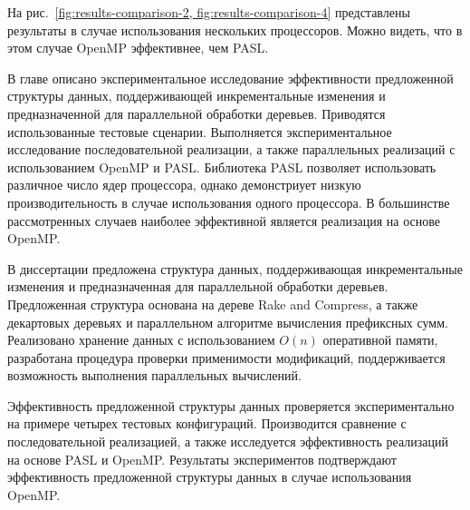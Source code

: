 \documentclass[specification,annotation]{itmo-student-thesis}
\begin{document}
На рис.~\ref{fig:results-comparison-2, fig:results-comparison-4} представлены результаты в случае использования нескольких процессоров. Можно видеть, что в этом случае OpenMP эффективнее, чем PASL.


\chapterconclusion

В главе описано экспериментальное исследование эффективности предложенной структуры данных, поддерживающей инкрементальные изменения и предназначенной для параллельной обработки деревьев. 
Приводятся использованные тестовые сценарии. Выполняется экспериментальное исследование последовательной реализации, а также параллельных реализаций с использованием OpenMP и PASL. Библиотека PASL позволяет использовать различное число ядер процессора, однако демонстриует низкую производительность в случае использования одного процессора. В большинстве рассмотренных случаев наиболее эффективной является реализация на основе OpenMP. 


\startconclusionpage

В диссертации предложена структура данных, поддерживающая инкрементальные изменения и предназначенная для параллельной обработки деревьев. Предложенная структура основана на дереве Rake and Compress, а также декартовых деревьях и параллельном алгоритме вычисления префиксных сумм. Реализовано хранение данных с использованием $O(n)$ оперативной памяти, разработана процедура проверки применимости модификаций, поддерживается возможность выполнения параллельных вычислений. 

Эффективность предложенной структуры данных проверяется экспериментально на примере четырех тестовых конфигураций. Производится сравнение с последовательной реализацией, а также исследуется эффективность реализаций на основе PASL и OpenMP. Результаты экспериментов подтверждают эффективность предложенной структуры данных в случае использования OpenMP. 

\printmainbibliography
\end{document}
